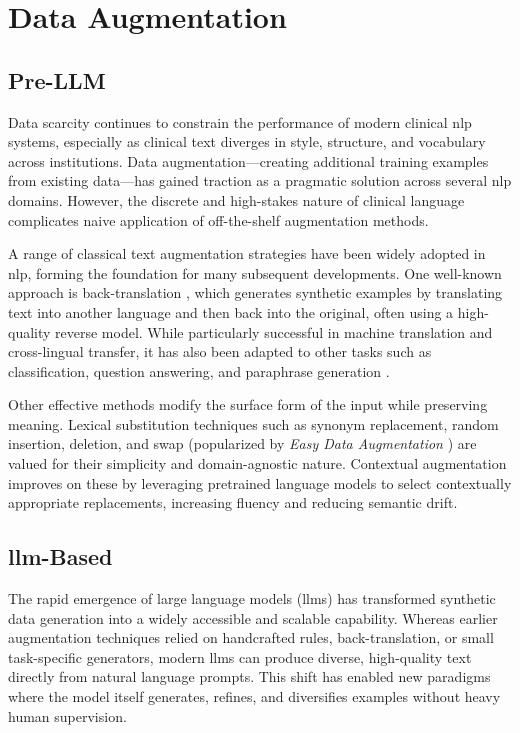 \section{Data Augmentation}
\subsection{Pre-LLM}
Data scarcity continues to constrain the performance of modern clinical \gls{nlp} systems, especially as clinical text diverges in style, structure, and vocabulary across institutions. Data augmentation—creating additional training examples from existing data—has gained traction as a pragmatic solution across several \gls{nlp} domains. However, the discrete and high-stakes nature of clinical language complicates naive application of off-the-shelf augmentation methods.

A range of classical text augmentation strategies have been widely adopted in \gls{nlp}, forming the foundation for many subsequent developments. One well-known approach is back-translation \citep{sennrich2016backtranslation,edunov2018btLargeScale}, which generates synthetic examples by translating text into another language and then back into the original, often using a high-quality reverse model. While particularly successful in machine translation and cross-lingual transfer, it has also been adapted to other tasks such as classification, question answering, and paraphrase generation \citep{sugiyama2019btContextAware}.

Other effective methods modify the surface form of the input while preserving meaning. Lexical substitution techniques such as synonym replacement, random insertion, deletion, and swap (popularized by \emph{Easy Data Augmentation} \citep{wei2019eda}) are valued for their simplicity and domain-agnostic nature. Contextual augmentation \citep{kobayashi2018contextual} improves on these by leveraging pretrained language models to select contextually appropriate replacements, increasing fluency and reducing semantic drift.
\subsection{\gls{llm}-Based}
The rapid emergence of large language models (\glspl{llm}) has transformed synthetic data generation into a widely accessible and scalable capability. Whereas earlier augmentation techniques relied on handcrafted rules, back-translation, or small task-specific generators, modern \glspl{llm} can produce diverse, high-quality text directly from natural language prompts. This shift has enabled new paradigms where the model itself generates, refines, and diversifies examples without heavy human supervision.


